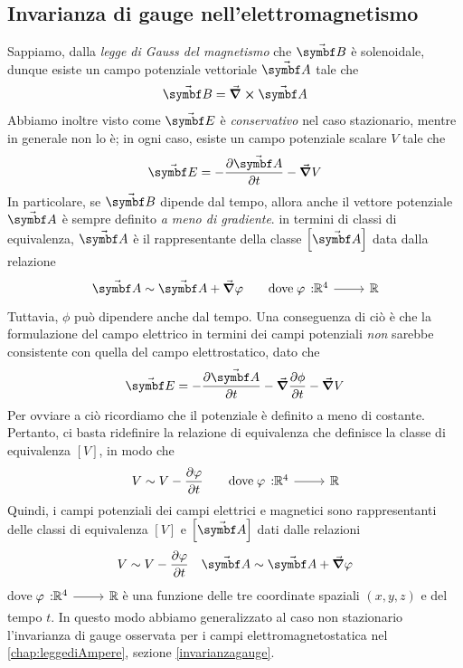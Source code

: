 \subsection{Invarianza di gauge nell'elettromagnetismo}
Sappiamo, dalla \textit{legge di Gauss del magnetismo} che $\vba{B}$ è solenoidale, dunque esiste un campo potenziale vettoriale $\vba{A}$ tale che
\begin{equation*}
	\vba{B}=\curl{\vba{A}}
\end{equation*}
Abbiamo inoltre visto come $\vba{E}$ è \textit{conservativo} nel caso stazionario, mentre in generale non lo è; in ogni caso, esiste un campo potenziale scalare $V$ tale che
\begin{equation*}
	\vba{E}=-\pdv{\vba{A}}{t}-\grad{V}
\end{equation*}
In particolare, se $\vba{B}$ dipende dal tempo, allora anche il vettore potenziale $\vba{A}$ è sempre definito \textit{a meno di gradiente}. in termini di classi di equivalenza, $\vba{A}$ è il rappresentante della classe $\left[\vba{A}\right]$ data dalla relazione
\begin{align*}
	\vba{A}\sim \vba{A}+\grad{\phi} \qquad \text{dove}\ \funz[\phi]{\realset^4}{\realset}
\end{align*}
Tuttavia, $\phi$ può dipendere anche dal tempo. Una conseguenza di ciò è che la formulazione del campo elettrico in termini dei campi potenziali \textit{non} sarebbe consistente con quella del campo elettrostatico, dato che
\begin{equation*}
	\vba{E}=-\pdv{\vba{A}}{t}-\grad{\pdv{\oldphi}{t}}-\grad{V}
\end{equation*}
Per ovviare a ciò ricordiamo che il potenziale è definito a meno di costante. Pertanto, ci basta ridefinire la relazione di equivalenza che definisce la classe di equivalenza $\left[V\right]$, in modo che
\begin{align*}
	V\sim V-\pdv{\phi}{t} \qquad \text{dove}\ \funz[\phi]{\realset^4}{\realset}
\end{align*}
Quindi, i campi potenziali dei campi elettrici e magnetici sono rappresentanti delle classi di equivalenza $\left[V\right]$ e $\left[\vba{A}\right]$ dati dalle relazioni
\begin{align*}
	V\sim V-\pdv{\phi}{t}&& \vba{A}\sim \vba{A}+\grad{\phi}
\end{align*}
dove $\funz[\phi]{\realset^4}{\realset}$ è una funzione delle tre coordinate spaziali $(x,y,z)$ e del tempo $t$. In questo modo abbiamo generalizzato al caso non stazionario l'invarianza di gauge osservata per i campi elettromagnetostatica nel \autoref{chap:leggediAmpere}, sezione \ref{invarianzagauge}.\\
